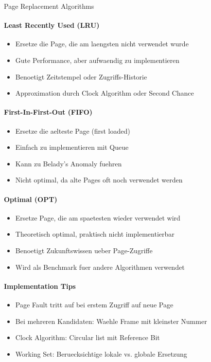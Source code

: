 \begin{KR}{Page Replacement Algorithms}
    \paragraph{Least Recently Used (LRU)}
    \begin{itemize}
        \item Ersetze die Page, die am laengsten nicht verwendet wurde
        \item Gute Performance, aber aufwaendig zu implementieren
        \item Benoetigt Zeitstempel oder Zugriffs-Historie
        \item Approximation durch Clock Algorithm oder Second Chance
    \end{itemize}
    
    \paragraph{First-In-First-Out (FIFO)}
    \begin{itemize}
        \item Ersetze die aelteste Page (first loaded)
        \item Einfach zu implementieren mit Queue
        \item Kann zu Belady's Anomaly fuehren
        \item Nicht optimal, da alte Pages oft noch verwendet werden
    \end{itemize}
    
    \paragraph{Optimal (OPT)}
    \begin{itemize}
        \item Ersetze Page, die am spaetesten wieder verwendet wird
        \item Theoretisch optimal, praktisch nicht implementierbar
        \item Benoetigt Zukunftswissen ueber Page-Zugriffe
        \item Wird als Benchmark fuer andere Algorithmen verwendet
    \end{itemize}
    
    \paragraph{Implementation Tips}
    \begin{itemize}
        \item Page Fault tritt auf bei erstem Zugriff auf neue Page
        \item Bei mehreren Kandidaten: Waehle Frame mit kleinster Nummer
        \item Clock Algorithm: Circular list mit Reference Bit
        \item Working Set: Beruecksichtige lokale vs. globale Ersetzung
    \end{itemize}
\end{KR}

